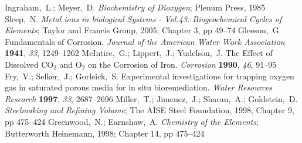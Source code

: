 \documentclass[aps,prl,twocolumn,superscriptaddress,groupedaddress]{revtex4}
\begin{document}
\begin{mcitethebibliography}{88}
Ingraham,~L.; Meyer,~D. \emph{Biochemistry of Dioxygen}; Plenum Press,
  1985\relax
\mciteBstWouldAddEndPuncttrue
\mciteSetBstMidEndSepPunct{\mcitedefaultmidpunct}
{\mcitedefaultendpunct}{\mcitedefaultseppunct}\relax
\EndOfBibitem
{}
Sleep,~N. \emph{Metal ions in biological Systems - Vol.43: Biogeochemical
  Cycles of Elements}; Taylor and Francis Group, 2005; Chapter 3, pp
  49--74\relax
\mciteBstWouldAddEndPuncttrue
\mciteSetBstMidEndSepPunct{\mcitedefaultmidpunct}
{\mcitedefaultendpunct}{\mcitedefaultseppunct}\relax
\EndOfBibitem
{}
Gleeson,~G. Fundamentals of Corrosion. \emph{Journal of the American Water Work
  Association} \textbf{1941}, \emph{33}, 1249--1262\relax
\mciteBstWouldAddEndPuncttrue
\mciteSetBstMidEndSepPunct{\mcitedefaultmidpunct}
{\mcitedefaultendpunct}{\mcitedefaultseppunct}\relax
\EndOfBibitem
{}
McIntire,~G.; Lippert,~J.; Yudelson,~J. The Effect of Dissolved $\mathrm{CO_2}$
  and $\mathrm{O_2}$ on the Corrosion of Iron. \emph{Corrosion} \textbf{1990},
  \emph{46}, 91--95\relax
\mciteBstWouldAddEndPuncttrue
\mciteSetBstMidEndSepPunct{\mcitedefaultmidpunct}
{\mcitedefaultendpunct}{\mcitedefaultseppunct}\relax
\EndOfBibitem
{}
Fry,~V.; Selker,~J.; Gorleick,~S. Experimental investigations for trapping
  oxygen gas in saturated porous media for in situ bioremediation. \emph{Water
  Resources Research} \textbf{1997}, \emph{33}, 2687--2696\relax
\mciteBstWouldAddEndPuncttrue
\mciteSetBstMidEndSepPunct{\mcitedefaultmidpunct}
{\mcitedefaultendpunct}{\mcitedefaultseppunct}\relax
\EndOfBibitem
{}
Miller,~T.; Jimenez,~J.; Sharan,~A.; Goldstein,~D. \emph{Steelmaking and
  Refining Volume}; The AISE Steel Foundation, 1998; Chapter 9, pp
  475--424\relax
\mciteBstWouldAddEndPuncttrue
\mciteSetBstMidEndSepPunct{\mcitedefaultmidpunct}
{\mcitedefaultendpunct}{\mcitedefaultseppunct}\relax
\EndOfBibitem
{}
Greenwood,~N.; Earnshaw,~A. \emph{Chemistry of the Elements}; Butterworth
  Heinemann, 1998; Chapter 14, pp 475--424\relax
\mciteBstWouldAddEndPuncttrue
\mciteSetBstMidEndSepPunct{\mcitedefaultmidpunct}
{\mcitedefaultendpunct}{\mcitedefaultseppunct}\relax
\EndOfBibitem
{}

\end{mcitethebibliography}
\end{document}
